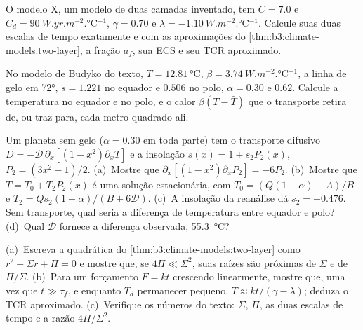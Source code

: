 \begin{exercise}[$\star\star$]\label{exo:b3:climate-models:8}
O modelo X, um modelo de duas camadas inventado, tem $C = 7.0$ e $C_d =
\qty{90}{W.yr.m^{-2}.\celsius^{-1}}$, $\gamma = 0.70$ e $\lambda =
\qty{-1.10}{W.m^{-2}.\celsius^{-1}}$. Calcule suas duas escalas de tempo exatamente
e com as aproximações do \cref{thm:b3:climate-models:two-layer}, a
fração $a_f$, sua ECS e seu TCR aproximado.
\end{exercise}

\begin{exercise}[$\star\star$]\label{exo:b3:climate-models:9}
No modelo de Budyko do texto, $\bar T = \qty{12.81}{\celsius}$, $\beta =
\qty{3.74}{W.m^{-2}.\celsius^{-1}}$, a linha de gelo em \ang{72}, $s = 1.221$
no equador e $0.506$ no polo, $\alpha = 0.30$ e $0.62$.
Calcule a temperatura no equador e no polo, e o calor
$\beta(T - \bar T)$ que o transporte retira de, ou traz para, cada
metro quadrado ali.
\end{exercise}

\begin{exercise}[$\star\star\star$]\label{exo:b3:climate-models:10}
Um planeta sem gelo ($\alpha = 0.30$ em toda parte) tem o
transporte difusivo $D = -\mathcal D\,\partial_x[(1 - x^2)\partial_xT]$ e a
insolação $s(x) = 1 + s_2P_2(x)$, $P_2 = (3x^2 - 1)/2$. (a)~Mostre que
$\partial_x[(1 - x^2)\partial_xP_2] = -6P_2$. (b)~Mostre que $T = T_0 +
T_2P_2(x)$ é uma solução estacionária, com $T_0 = (Q(1 - \alpha) - A)/B$ e
$T_2 = Qs_2(1 - \alpha)/(B + 6\mathcal D)$. (c)~A insolação da
reanálise dá $s_2 = \num{-0.476}$. Sem transporte, qual seria a
diferença de temperatura entre equador e polo? (d)~Qual $\mathcal D$ fornece
a diferença observada, \qty{55.3}{\celsius}?
\end{exercise}

\begin{exercise}[$\star\star\star$]\label{exo:b3:climate-models:11}
(a)~Escreva a quadrática do \cref{thm:b3:climate-models:two-layer} como $r^2 -
\Sigma r + \Pi = 0$ e mostre que, se $4\Pi \ll \Sigma^2$, suas raízes são
próximas de $\Sigma$ e de $\Pi/\Sigma$. (b)~Para um forçamento $F = kt$ crescendo
linearmente, mostre que, uma vez que $t \gg \tau_f$, e enquanto $T_d$ permanecer pequeno,
$T \approx kt/(\gamma - \lambda)$; deduza o TCR aproximado. (c)~Verifique
os números do texto: $\Sigma$, $\Pi$, as duas escalas de tempo e a
razão $4\Pi/\Sigma^2$.
\end{exercise}

